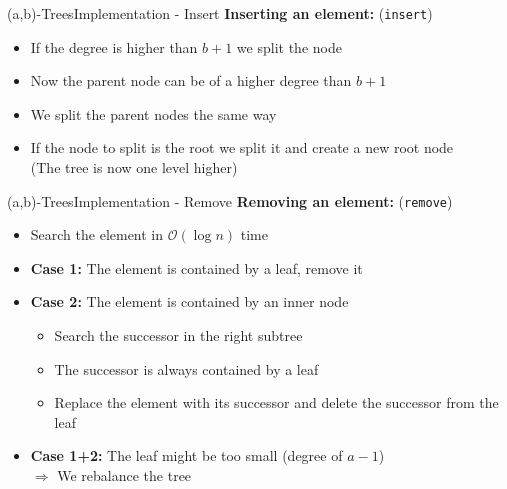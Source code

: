 
\begin{frame}{(a,b)-Trees}{Implementation - Insert}
  \textbf{Inserting an element:} (\texttt{\color{Mittel-Blau}insert})
  \begin{itemize}
    \item
      If the degree is higher than {\color{Mittel-Blau}$b+1$}
      we split the node
    \item
      Now the parent node can be of a higher degree than
      {\color{Mittel-Blau}$b+1$}
    \item
      We {\color{Mittel-Blau}split} the parent nodes the same way
    \item
      If the node to split is the root we split it and create a new root node\\
      (The tree is now one level higher)
  \end{itemize}
\end{frame}


\begin{frame}{(a,b)-Trees}{Implementation - Remove}
  \textbf{Removing an element:} (\texttt{\color{Mittel-Blau}remove})
  \begin{itemize}
    \item
      Search the element in $\mathcal{O}(\log n)$ time
    \item
      \textbf{Case 1:}
      The element is contained by a leaf, remove it
    \item
      \textbf{Case 2:}
      The element is contained by an inner node
      \begin{itemize}
        \item
          Search the {\color{Mittel-Blau}successor} in the right subtree
        \item
          The {\color{Mittel-Blau}successor} is always contained by a leaf
        \item
          Replace the element with its {\color{Mittel-Blau}successor} and
          delete the {\color{Mittel-Blau}successor} from the leaf
      \end{itemize}
    \item
      \textbf{Case 1+2:}
      The leaf might be too small (degree of {\color{Mittel-Blau}$a-1$})\\
      $\Rightarrow$ We {\color{Mittel-Blau}rebalance} the tree
  \end{itemize}
\end{frame}

